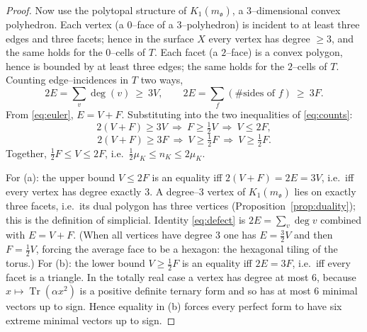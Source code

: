 \documentclass[11pt,reqno]{amsart}
\theoremstyle{plain}
\theoremstyle{definition}
\newcommand{\Tr}{\operatorname{Tr}}
\newcommand{\Ok}{\mathfrak{o}}
\newcommand{\nK}{n_K}
\newcommand{\muK}{\mu_K}
\begin{document}
\begin{proof}
Now use the polytopal structure of $K_1(m_\Ok)$, a $3$--dimensional convex polyhedron. Each vertex (a
$0$--face of a $3$--polyhedron) is incident to at least three edges and three facets; hence in the surface
$X$ every vertex has degree $\ge3$, and the same holds for the $0$--cells of $T$. Each facet (a $2$--face)
is a convex polygon, hence is bounded by at least three edges; the same holds for the $2$--cells of $T$.
Counting edge--incidences in $T$ two ways,
\begin{equation}\label{eq:counts}
2E=\sum_{v}\deg(v)\ \ge\ 3V,\qquad 2E=\sum_{f}(\#\text{sides of }f)\ \ge\ 3F .
\end{equation}
From \eqref{eq:euler}, $E=V+F$. Substituting into the two inequalities of \eqref{eq:counts}:
\[
2(V+F)\ge 3V\ \Longrightarrow\ F\ge\tfrac12 V\ \Longrightarrow\ V\le 2F ,
\]
\[
2(V+F)\ge 3F\ \Longrightarrow\ V\ge\tfrac12 F\ \Longrightarrow\ V\ge\tfrac12 F .
\]
Together, $\tfrac12 F\le V\le 2F$, i.e.\ $\tfrac12\muK\le\nK\le 2\muK$.

For (a): the upper bound $V\le 2F$ is an equality iff $2(V+F)=2E=3V$, i.e.\ iff every vertex has degree
exactly $3$. A degree--$3$ vertex of $K_1(m_\Ok)$ lies on exactly three facets, i.e.\ its dual polygon has
three vertices (Proposition~\ref{prop:duality}); this is the definition of simplicial. Identity
\eqref{eq:defect} is $2E=\sum_v\deg v$ combined with $E=V+F$. (When all vertices have degree $3$ one has $E=\tfrac32 V$ and then $F=\tfrac12 V$,
forcing the average face to be a hexagon: the hexagonal tiling of the torus.) For (b): the lower bound
$V\ge\tfrac12 F$ is an equality iff $2E=3F$, i.e.\ iff every facet is a triangle. In the totally real case a
vertex has degree at most $6$, because $x\mapsto\Tr(\alpha x^2)$ is a positive definite ternary form and so
has at most $6$ minimal vectors up to sign. Hence equality in (b) forces every perfect form to have six extreme
minimal vectors up to sign.
\end{proof}
\end{document}
